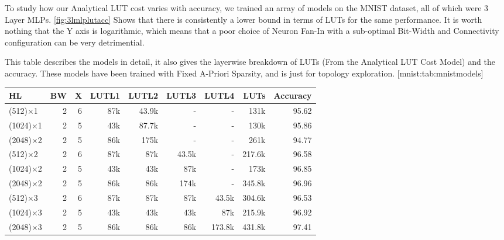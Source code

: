 To study how our Analytical LUT cost varies with accuracy, we trained an array of models on the MNIST dataset, all of which were 3 Layer MLPs. \cref{fig:3lmlplutacc} Shows that there is consistently a lower bound in terms of LUTs for the same performance. It is worth nothing that the Y axis is logarithmic, which means that a poor choice of Neuron Fan-In with a sub-optimal Bit-Width and Connectivity configuration can be very detrimential. 

\begin{table}
    \begin{sidecaption}{%
        This table describes the models in detail, it also gives the layerwise breakdown of LUTs (From the Analytical LUT Cost Model) and the accuracy. These models have been trained with Fixed A-Priori Sparsity, and is just for topology exploration. 
    }[mnist:tab:mnistmodels]
\begin{threeparttable}
\begin{tabular}{lrrrrrrrr}
\hline
HL              & BW & X & LUTL1   & LUTL2 & LUTL3 & LUTL4    & LUTs & Accuracy \\ \hline
(512)$\times$1  & 2  & 6 & 87k   & 43.9k & -  & -           & 131k   & 95.62    \\
(1024)$\times$1 & 2  & 5 & 43k   & 87.7k & -  & -           & 130k   & 95.86         \\
(2048)$\times$2 & 2  & 5 & 86k   & 175k    & -    & -     & 261k     & 94.77          \\ 
(512)$\times$2  & 2  & 6 & 87k   & 87k    & 43.5k    & -    & 217.6k & 96.58     \\ 
(1024)$\times$2 & 2  & 5 & 43k   & 43k    & 87k    & -     & 173k    & 96.85         \\ 
(2048)$\times$2 & 2  & 5 & 86k   & 86k    & 174k    & -     & 345.8k & 96.96         \\ 
(512)$\times$3  & 2  & 6 & 87k   & 87k    & 87k    & 43.5k  & 304.6k & 96.53   \\ 
(1024)$\times$3 & 2  & 5 & 43k   & 43k    & 43k    & 87k  &  215.9k  & 96.92    \\ 
(2048)$\times$3 & 2  & 5 & 86k   & 86k    & 86k & 173.8k   &  431.8k & 97.41          \\ \hline
\end{tabular}
\end{threeparttable}
\end{sidecaption}
\end{table}

